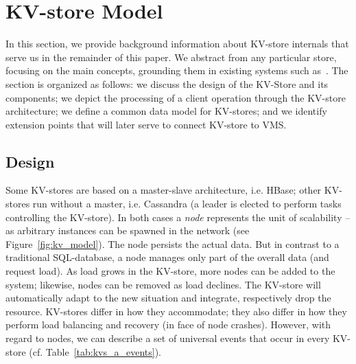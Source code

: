 %
%
\section{KV-store Model}
\label{sec:kv_model}

In this section, we provide background information about KV-store
internals that serve us in the remainder of this paper.  We abstract
from any particular store, focusing on the main concepts, grounding
them in existing systems such as~\cite{chang:bigtable,
  decandia:dynamo, cooper:pnuts, george:hbase, hewitt:cassandra}. 
The section is organized as follows: we discuss the design of the 
KV-Store and its components; we depict the processing of 
a client operation through the KV-store architecture; we define a common data 
model for KV-stores; and we identify extension points that will later
serve to connect KV-store to VMS.


  
  

\subsection{Design}


Some KV-stores are based on a master-slave architecture, i.e. HBase;
other KV-stores run without a master, i.e. Cassandra (a leader 
is elected to perform tasks controlling the KV-store). 
In both cases a \textit{node} represents the unit of scalability -- 
as arbitrary instances can be spawned in the network (see 
Figure~\ref{fig:kv_model}). The node persists the actual data.  But in
contrast to a traditional SQL-database, a node manages only part of the 
overall data (and request load). As load grows in the KV-store, more 
nodes can be added to the system; likewise, nodes can be removed as load 
declines. The KV-store will automatically adapt to the new situation and 
integrate, respectively drop the resource. KV-stores differ in how they 
accommodate;  they also differ in how they perform load balancing and 
recovery (in face of node crashes). However, with regard to nodes, we can 
describe a set of universal events that occur in every KV-store 
(cf. Table~\ref{tab:kvs_a_events}).



